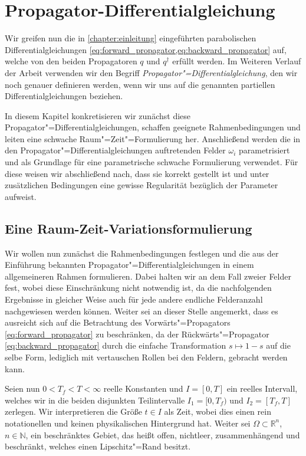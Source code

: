 \documentclass[../main.tex]{subfiles}
\begin{document}
\chapter{Propagator-Differentialgleichung} %
\label{chapter:propagator_differentialgleichung}

Wir greifen nun die in \cref{chapter:einleitung} eingeführten parabolischen Differentialgleichungen \cref{eq:forward_propagator,eq:backward_propagator} auf, welche von den beiden Propagatoren $q$ und $q^{\dagger}$ erfüllt werden.
Im Weiteren Verlauf der Arbeit verwenden wir den Begriff \emph{Propagator"=Differentialgleichung}, den wir noch genauer definieren werden, wenn wir uns
auf die genannten partiellen Differentialgleichungen beziehen.

In diesem Kapitel konkretisieren wir zunächst diese Propagator"=Differentialgleichungen, schaffen geeignete Rahmenbedingungen und leiten eine schwache Raum"=Zeit"=Formulierung her.
Anschließend werden die in den Propagator"=Differentialgleichungen auftretenden Felder $\omega_{i}$ parametrisiert und als Grundlage für eine parametrische schwache Formulierung verwendet.
Für diese weisen wir abschließend nach, dass sie korrekt gestellt ist und unter zusätzlichen Bedingungen eine gewisse Regularität bezüglich der Parameter aufweist.


\section{Eine Raum-Zeit-Variationsformulierung}
\label{section:raum_zeit_variationsformulierung}

Wir wollen nun zunächst die Rahmenbedingungen festlegen und die aus der Einführung bekannten Propagator"=Differentialgleichungen in einem allgemeineren Rahmen formulieren.
Dabei halten wir an dem Fall zweier Felder fest, wobei diese Einschränkung nicht notwendig ist, da die nachfolgenden Ergebnisse in gleicher Weise auch für jede andere endliche Felderanzahl nachgewiesen werden können.
Weiter sei an dieser Stelle angemerkt, dass es ausreicht sich auf die Betrachtung des Vorwärts"=Propagators \cref{eq:forward_propagator} zu beschränken, da der Rückwärts"=Propagator \cref{eq:backward_propagator} durch die einfache Transformation $s \mapsto 1 - s$ auf die selbe Form, lediglich mit vertauschen Rollen bei den Feldern, gebracht werden kann.

Seien nun $0 < T_{f} < T < \infty$ reelle Konstanten und $I = [0, T]$ ein reelles Intervall, welches wir in die beiden disjunkten Teilintervalle $I_{1} = [0, T_{f})$ und $I_{2} = [T_{f}, T]$ zerlegen.
Wir interpretieren die Größe $t \in I$ als Zeit, wobei dies einen rein notationellen und keinen physikalischen Hintergrund hat.
Weiter sei $\Omega \subset \mathbb{R}^{n}$, $n \in \mathbb{N}$, ein beschränktes Gebiet, das heißt offen, nichtleer, zusammenhängend und beschränkt, welches einen Lipschitz"=Rand besitzt.
\end{document}
